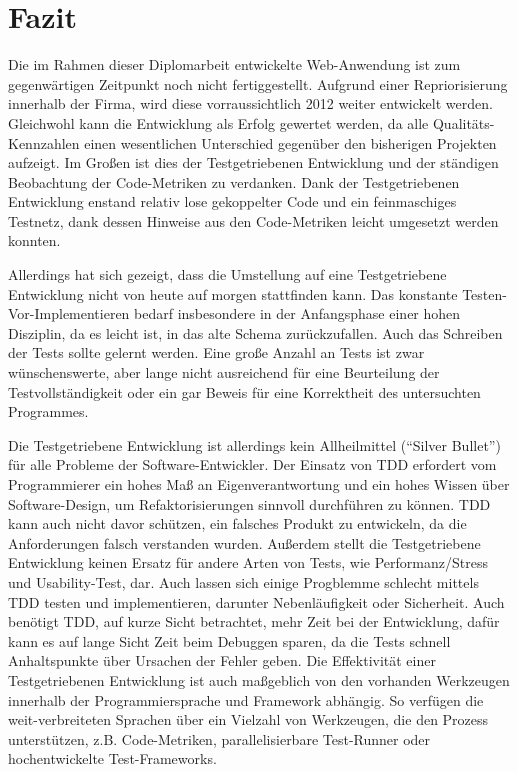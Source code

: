 \chapter{Fazit}
\label{sec:fazit}

Die im Rahmen dieser Diplomarbeit entwickelte Web-Anwendung ist zum gegenwärtigen Zeitpunkt noch nicht fertiggestellt. Aufgrund einer Repriorisierung innerhalb der Firma, wird diese vorraussichtlich 2012 weiter entwickelt werden. Gleichwohl kann die Entwicklung als Erfolg gewertet werden, da alle Qualitäts-Kennzahlen einen wesentlichen Unterschied gegenüber den bisherigen Projekten aufzeigt. Im Großen ist dies der Testgetriebenen Entwicklung und der ständigen Beobachtung der Code-Metriken zu verdanken. Dank der Testgetriebenen Entwicklung enstand relativ lose gekoppelter Code und ein feinmaschiges Testnetz, dank dessen Hinweise aus den Code-Metriken leicht umgesetzt werden konnten.

Allerdings hat sich gezeigt, dass die Umstellung auf eine Testgetriebene Entwicklung nicht von heute auf morgen stattfinden kann. Das
konstante Testen-Vor\hyp{}Implementieren bedarf insbesondere in der Anfangsphase einer hohen Disziplin, da es leicht ist, in das alte Schema zurückzufallen. Auch das Schreiben der Tests sollte gelernt werden. Eine große Anzahl an Tests ist zwar wünschenswerte, aber lange nicht ausreichend für eine Beurteilung der Testvollständigkeit oder ein gar Beweis für eine Korrektheit des untersuchten Programmes.

Die Testgetriebene Entwicklung ist allerdings kein Allheilmittel ("`Silver Bullet"') für alle Probleme der Software-Entwickler. Der Einsatz von TDD erfordert vom Programmierer ein hohes Maß an Eigenverantwortung und ein hohes Wissen über Software-Design, um Refaktorisierungen sinnvoll durchführen zu können. TDD kann auch nicht davor schützen, ein falsches Produkt zu entwickeln, da die Anforderungen falsch verstanden wurden. Außerdem stellt die Testgetriebene Entwicklung keinen Ersatz für andere Arten von Tests, wie Performanz/Stress und Usability-Test, dar. Auch lassen sich einige Progblemme schlecht mittels TDD testen und implementieren, darunter Nebenläufigkeit oder Sicherheit.  Auch benötigt TDD, auf kurze Sicht betrachtet, mehr Zeit bei der Entwicklung, dafür kann es auf lange Sicht Zeit beim Debuggen sparen, da die Tests schnell Anhaltspunkte über Ursachen der Fehler geben.
Die Effektivität einer Testgetriebenen Entwicklung ist auch maßgeblich von den vorhanden Werkzeugen innerhalb der Programmiersprache und Framework abhängig. So verfügen die weit-verbreiteten Sprachen über ein Vielzahl von Werkzeugen, die den Prozess unterstützen, z.B. Code-Metriken, parallelisierbare Test-Runner oder hochentwickelte Test-Frameworks.

